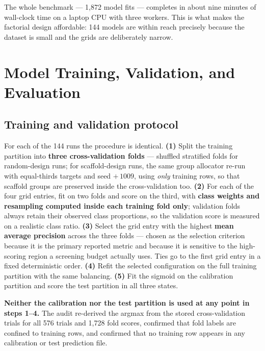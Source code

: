 \documentclass[10pt,letterpaper]{article}
\begin{document}
The whole benchmark --- 1{,}872 model fits --- completes in about nine minutes of wall-clock time on
a laptop CPU with three workers. This is what makes the factorial design affordable: 144 models are
within reach precisely because the dataset is small and the grids are deliberately narrow.

\section{Model Training, Validation, and Evaluation}
\label{sec:training}

\subsection{Training and validation protocol}

For each of the 144 runs the procedure is identical.
\textbf{(1)} Split the training partition into \textbf{three cross-validation folds} --- shuffled
stratified folds for random-design runs; for scaffold-design runs, the same group allocator re-run
with equal-thirds targets and seed $+\,1009$, using \emph{only} training rows, so that scaffold
groups are preserved inside the cross-validation too.
\textbf{(2)} For each of the four grid entries, fit on two folds and score on the third, with
\textbf{class weights and resampling computed inside each training fold only}; validation folds
always retain their observed class proportions, so the validation score is measured on a realistic
class ratio.
\textbf{(3)} Select the grid entry with the highest \textbf{mean average precision} across the three
folds --- chosen as the selection criterion because it is the primary reported metric and because it
is sensitive to the high-scoring region a screening budget actually uses. Ties go to the first grid
entry in a fixed deterministic order.
\textbf{(4)} Refit the selected configuration on the full training partition with the same balancing.
\textbf{(5)} Fit the sigmoid on the calibration partition and score the test partition in all three
states.

\textbf{Neither the calibration nor the test partition is used at any point in steps 1--4.} The audit
re-derived the argmax from the stored cross-validation trials for all 576 trials and 1{,}728 fold
scores, confirmed that fold labels are confined to training rows, and confirmed that no training row
appears in any calibration or test prediction file.
\end{document}
